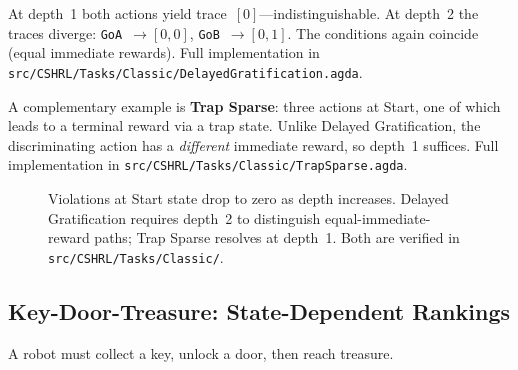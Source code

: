 \documentclass[9pt,a4paper]{article}
\newcommand{\fpath}[1]{\nolinkurl{#1}}
\theoremstyle{plain}
\theoremstyle{definition}
\theoremstyle{remark}
\begin{document}
\noindent At depth~1 both actions yield trace~$[0]$---indistinguishable.  At depth~2 the traces diverge: \texttt{GoA}~$\to [0,0]$, \texttt{GoB}~$\to [0,1]$.  The conditions again coincide (equal immediate rewards).  Full implementation in \fpath{src/CSHRL/Tasks/Classic/DelayedGratification.agda}.

A complementary example is \textbf{Trap Sparse}: three actions at Start, one of which leads to a terminal reward via a trap state.  Unlike Delayed Gratification, the discriminating action has a \emph{different} immediate reward, so depth~1 suffices.  Full implementation in \fpath{src/CSHRL/Tasks/Classic/TrapSparse.agda}.

\begin{figure}[H]
\centering
{}
\caption{Violations at Start state drop to zero as depth increases.  Delayed Gratification requires depth~2 to distinguish equal-immediate-reward paths; Trap Sparse resolves at depth~1.  Both are verified in \protect\fpath{src/CSHRL/Tasks/Classic/}.}
\label{fig:violations}
\end{figure}

\subsection{Key-Door-Treasure: State-Dependent Rankings}

A robot must collect a key, unlock a door, then reach treasure.
\end{document}
